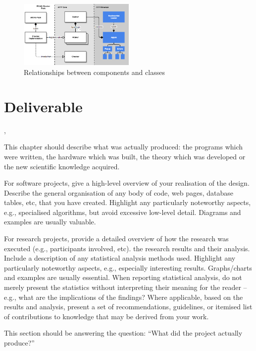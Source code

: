 \begin{figure}[H]
\centering
\includegraphics[width=0.5\textwidth]{figures/a11y_tool_browser_design}
\captionsetup{justification=centering}
\caption{Relationships between components and classes
\label{fig:a11y_tool_browser_design}}
\end{figure}


\section{Deliverable}

,

This chapter should describe what was actually produced: the programs which
were written, the hardware which was built, the theory which was developed or
the new scientific knowledge acquired.

For software projects, give a high-level overview of your realisation of the
design. Describe the general organisation of any body of code, web pages,
database tables, etc, that you have created. Highlight any particularly
noteworthy aspects, e.g., specialised algorithms, but avoid excessive low-level
detail. Diagrams and examples are usually valuable.

For research projects, provide a detailed overview of how the research was
executed (e.g., participants involved, etc). the research results and their
analysis. Include a description of any statistical analysis methods used.
Highlight any particularly noteworthy aspects, e.g., especially interesting
results. Graphs/charts and examples are usually essential. When reporting
statistical analysis, do not merely present the statistics without interpreting
their meaning for the reader – e.g., what are the implications of the findings?
Where applicable, based on the results and analysis, present a set of
recommendations, guidelines, or itemised list of contributions to knowledge
that may be derived from your work.

This section should be answering the question: “What did the project actually
produce?”
